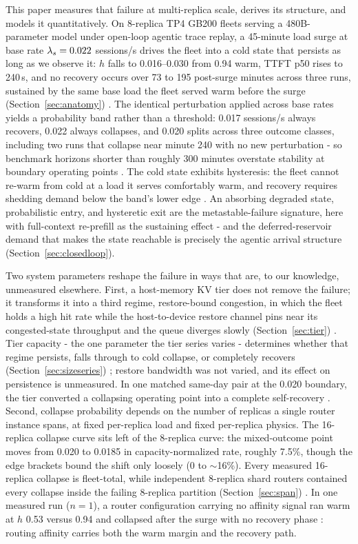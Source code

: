 This paper measures that failure at multi-replica scale, derives its
structure, and models it quantitatively. On 8-replica TP4 GB200
fleets serving a 480B-parameter model under open-loop agentic trace
replay, a 45-minute load surge at base rate $\lambda_s = 0.022$
sessions/s drives the fleet into a cold state that persists as long
as we observe it: $h$ falls to 0.016--0.030 from 0.94 warm, TTFT p50
rises to 240\,s, and no recovery occurs over 73 to 195 post-surge
minutes across three runs, sustained by the same base load the fleet
served warm before the surge (Section~\ref{sec:anatomy}) . The identical
perturbation applied across base rates yields a probability band
rather than a threshold: 0.017 sessions/s always recovers, 0.022
always collapses, and 0.020 splits across three outcome classes,
including two runs that collapse near minute 240 with no new
perturbation - so benchmark horizons shorter than roughly 300
minutes overstate stability at boundary operating points .
The cold state exhibits hysteresis: the fleet cannot re-warm from
cold at a load it serves comfortably warm, and recovery requires
shedding demand below the band's lower edge . An absorbing
degraded state, probabilistic entry, and hysteretic exit are the
metastable-failure signature, here with full-context re-prefill as
the sustaining effect - and the deferred-reservoir demand that makes
the state reachable is precisely the agentic arrival structure
(Section~\ref{sec:closedloop}).

Two system parameters reshape the failure in ways that are, to our
knowledge, unmeasured elsewhere. First, a host-memory KV tier does
not remove the failure; it transforms it into a third regime,
restore-bound congestion, in which the fleet holds a high hit rate
while the host-to-device restore channel pins near its
congested-state throughput and the queue diverges slowly (Section~\ref{sec:tier})
. Tier capacity - the one parameter the tier series varies -
determines whether that regime persists, falls through to cold
collapse, or completely recovers (Section~\ref{sec:sizeseries}) ; restore
bandwidth was not varied, and its effect on persistence is
unmeasured. In one matched same-day pair at the 0.020 boundary, the
tier converted a collapsing operating point into a complete
self-recovery . Second, collapse probability depends on the
number of replicas a single router instance spans, at fixed
per-replica load and fixed per-replica physics. The 16-replica
collapse curve sits left of the 8-replica curve: the mixed-outcome
point moves from 0.020 to 0.0185 in capacity-normalized rate,
roughly 7.5\%, though the edge brackets bound the shift only loosely
(0 to $\sim$16\%). Every measured 16-replica collapse is fleet-total,
while independent 8-replica shard routers contained every collapse
inside the failing 8-replica partition (Section~\ref{sec:span}) .
In one measured run ($n=1$), a router configuration carrying no
affinity signal ran warm at $h$ 0.53 versus 0.94 and collapsed after
the surge with no recovery phase : routing affinity carries
both the warm margin and the recovery path.

